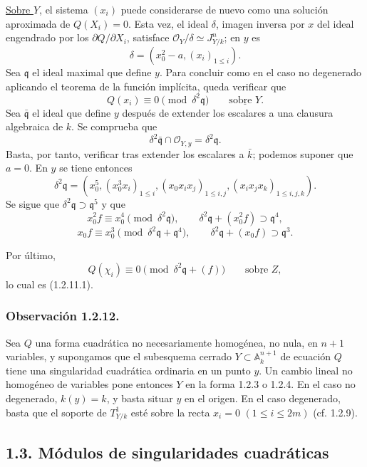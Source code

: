 \underline{Sobre $Y$}, el sistema $(x_i)$ puede considerarse de nuevo
como una solución aproximada de $Q(X_i)=0$. Esta vez, el ideal $\delta$,
imagen inversa por $x$ del ideal engendrado por los
$\partial Q/\partial X_i$, satisface
$\mathcal O_Y/\delta\simeq J^n_{Y/k}$; en $y$ es
\[
\delta=(x_0^2-a,(x_i)_{1\leq i}).
\]
Sea $\mathfrak q$ el ideal maximal que define $y$. Para concluir como
en el caso no degenerado aplicando el teorema de la función implícita,
queda verificar que
\begin{equation}\tag{1.2.11.1}
Q(x_i)\equiv0\pmod{\delta^2\mathfrak q}
\qquad\underline{\text{sobre }Y}.
\end{equation}
Sea $\bar{\mathfrak q}$ el ideal que define $y$ después de extender
los escalares a una clausura algebraica de $k$. Se comprueba que
\[
\delta^2\bar{\mathfrak q}\cap\mathcal O_{Y,y}
=\delta^2\mathfrak q.
\]
Basta, por tanto, verificar  tras extender
los escalares a $\bar k$; podemos suponer que $a=0$. En $y$ se tiene
entonces
\[
\delta^2\mathfrak q=
(x_0^5,(x_0^3x_i)_{1\leq i},
 (x_0x_ix_j)_{1\leq i,j},
 (x_ix_jx_k)_{1\leq i,j,k}).
\]
Se sigue que $\delta^2\mathfrak q\supset\mathfrak q^5$ y que
\[
x_0^2f\equiv x_0^4\pmod{\delta^2\mathfrak q},
\qquad
\delta^2\mathfrak q+(x_0^2f)\supset\mathfrak q^4,
\]
\[
x_0f\equiv x_0^3
 \pmod{\delta^2\mathfrak q+\mathfrak q^4},
\qquad
\delta^2\mathfrak q+(x_0f)\supset\mathfrak q^3.
\]

\pageoriginale

Por último,
\[
Q(\chi_i)\equiv0
\pmod{\delta^2\mathfrak q+(f)}
\qquad\underline{\text{sobre }Z},
\]
lo cual es (1.2.11.1).

\subsubsection*{Observación 1.2.12.}
Sea $Q$ una forma cuadrática no necesariamente homogénea, no nula,
en $n+1$ variables, y supongamos que el subesquema cerrado
$Y\subset\mathbb A_k^{n+1}$ de ecuación $Q$ tiene una singularidad
cuadrática ordinaria en un punto $y$. Un cambio lineal no homogéneo de
variables pone entonces $Y$ en la forma 1.2.3 o 1.2.4. En el caso no
degenerado, $k(y)=k$, y basta situar $y$ en el origen. En el caso
degenerado, basta que el soporte de $T^1_{Y/k}$ esté sobre la recta
$x_i=0$ $(1\leq i\leq2m)$ (cf. 1.2.9).

\subsection*{1.3. Módulos de singularidades cuadráticas}

